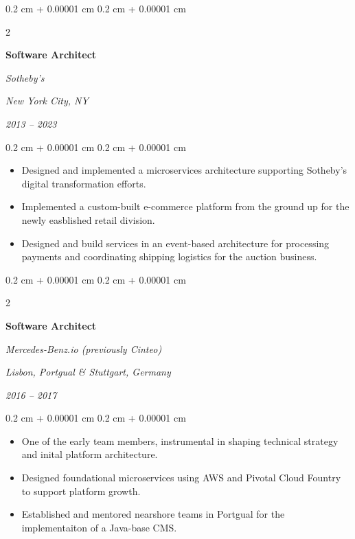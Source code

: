 \documentclass[10pt, a4paper]{article}
\newenvironment{highlights}{
    \begin{itemize}[
        topsep=0.10 cm,
        parsep=0.10 cm,
        partopsep=0pt,
        itemsep=0pt,
        leftmargin=0.4 cm + 10pt
    ]
}{
    \end{itemize}
} %
\newenvironment{onecolentry}{
    \begin{adjustwidth}{
        0.2 cm + 0.00001 cm
    }{
        0.2 cm + 0.00001 cm
    }
}{
    \end{adjustwidth}
} %
\newenvironment{twocolentry}[2][]{
    \onecolentry
    \def\secondColumn{#2}
    \setcolumnwidth{\fill, 8 cm}
    \begin{paracol}{2}
}{
    \switchcolumn \raggedleft \secondColumn
    \end{paracol}
    \endonecolentry
} %
\begin{document}
\vspace{0.2 cm}

%
%
\begin{twocolentry}{
        \textit{New York City, NY}

        \textit{2013 – 2023}}
    \textbf{Software Architect}

    \textit{Sotheby's}
\end{twocolentry}

\vspace{0.10 cm}
\begin{onecolentry}
    \begin{highlights}
        \item Designed and implemented a microservices architecture supporting Sotheby's digital transformation efforts.
        \item Implemented a custom-built e-commerce platform from the ground up for the newly easblished retail division.
        \item Designed and build services in an event-based architecture for processing payments and coordinating shipping logistics for the auction business.
    \end{highlights}
\end{onecolentry}

\vspace{0.2 cm}

%
%
\begin{twocolentry}{
        \textit{Lisbon, Portgual \& Stuttgart, Germany}

        \textit{2016 – 2017}}
    \textbf{Software Architect}

    \textit{Mercedes-Benz.io (previously Cinteo)}
\end{twocolentry}

\vspace{0.10 cm}
\begin{onecolentry}
    \begin{highlights}
        \item One of the early team members, instrumental in shaping technical strategy and inital platform architecture.
        \item Designed foundational microservices using AWS and Pivotal Cloud Fountry to support platform growth.
        \item Established and mentored nearshore teams in Portgual for the implementaiton of a Java-base CMS.
    \end{highlights}
\end{onecolentry}
\end{document}
